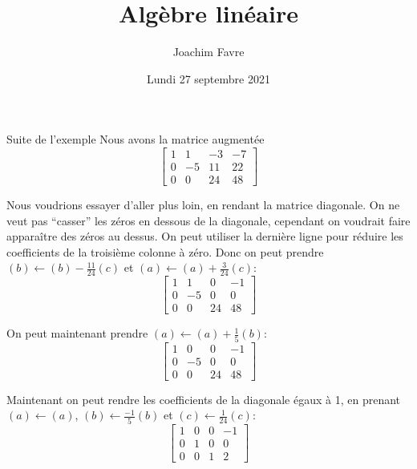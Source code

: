 \documentclass{article}
\title{Algèbre linéaire}
\author{Joachim Favre}
\date{Lundi 27 septembre 2021}
\begin{document}
\maketitle


\begin{parag}{Suite de l'exemple}
    Nous avons la matrice augmentée
    \[\begin{bmatrix} 1 & 1 & -3 & -7 \\ 0 & -5 & 11 & 22 \\ 0 & 0 & 24 & 48 \end{bmatrix}\]

    Nous voudrions essayer d'aller plus loin, en rendant la matrice diagonale. On ne veut pas ``casser'' les zéros en dessous de la diagonale, cependant on voudrait faire apparaître des zéros au dessus. On peut utiliser la dernière ligne pour réduire les coefficients de la troisième colonne à zéro. Donc on peut prendre $\left(b\right) \leftarrow \left(b\right) - \frac{11}{24}\left(c\right)$ et $\left(a\right) \leftarrow \left(a\right) + \frac{3}{24}\left(c\right)$:
    \[\begin{bmatrix} 1 & 1 & 0 & -1 \\ 0 & -5 & 0 & 0 \\ 0 & 0 & 24 & 48 \end{bmatrix} \]

    On peut maintenant prendre $\left(a\right) \leftarrow \left(a\right) + \frac{1}{5}\left(b\right)$:
    \[\begin{bmatrix} 1 & 0 & 0 & -1 \\ 0 & -5 & 0 & 0 \\ 0 & 0 & 24 & 48 \end{bmatrix}\]

    Maintenant on peut rendre les coefficients de la diagonale égaux à 1, en prenant $\left(a\right) \leftarrow \left(a\right)$, $\left(b\right) \leftarrow \frac{-1}{5}\left(b\right)$ et $\left(c\right) \leftarrow \frac{1}{24}\left(c\right)$:
    \[\begin{bmatrix} 1 & 0 & 0 & -1 \\ 0 & 1 & 0 & 0 \\ 0 & 0 & 1 & 2 \end{bmatrix} \]


\end{parag}
\end{document}
